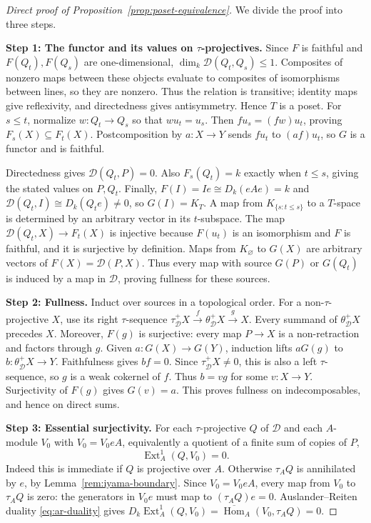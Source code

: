 \documentclass[a4paper,reqno,10pt]{amsart}
\theoremstyle{definition}
\numberwithin{equation}{section}
\DeclareMathOperator{\Hom}{Hom}
\DeclareMathOperator{\Ext}{Ext}
\newcommand{\cD}{\mathcal D}
\newcommand{\Dk}{D_k}
\newcommand{\ohom}{\overline{\Hom}}
\begin{document}
\begin{proof}[Direct proof of Proposition~\ref{prop:poset-equivalence}]
We divide the proof into three steps.

\textbf{Step 1: The functor and its values on \(\tau\)-projectives.}
Since \(F\) is faithful and \(F(Q_t),F(Q_s)\) are one-dimensional,
\(\dim_k\cD(Q_t,Q_s)\leq1\).
Composites of nonzero maps between these objects evaluate to composites of
isomorphisms between lines, so they are nonzero. Thus the relation is
transitive; identity maps give reflexivity, and directedness gives
antisymmetry. Hence \(T\) is a poset.
For \(s\leq t\), normalize \(w:Q_t\to Q_s\) so that \(wu_t=u_s\).
Then \(fu_s=(fw)u_t\), proving \(F_s(X)\subseteq F_t(X)\).
Postcomposition by \(a:X\to Y\) sends \(fu_t\) to \((af)u_t\), so
\(G\) is a functor and is faithful.

Directedness gives \(\cD(Q_t,P)=0\). Also \(F_s(Q_t)=k\) exactly
when \(t\leq s\), giving the stated values on \(P,Q_t\).
Finally, \(F(I)=Ie\cong\Dk(eAe)=k\) and \(\cD(Q_t,I)\cong\Dk(Q_te)\ne0\), so
\(G(I)=K_T\).
A map from \(K_{\{s:t\leq s\}}\) to a \(T\)-space is determined by
an arbitrary vector in its \(t\)-subspace. The map
\(\cD(Q_t,X)\to F_t(X)\) is injective because \(F(u_t)\) is an
isomorphism and \(F\) is faithful, and it is surjective by definition.
Maps from \(K_\varnothing\) to \(G(X)\) are arbitrary vectors of
\(F(X)=\cD(P,X)\). Thus every map with source \(G(P)\) or \(G(Q_t)\)
is induced by a map in \(\cD\), proving fullness for these sources.

\textbf{Step 2: Fullness.}
Induct over sources in a topological order. For a non-\(\tau\)-projective
\(X\), use its right \(\tau\)-sequence
\(\tau_{\cD}^+X\xrightarrow{f}\theta_{\cD}^+X\xrightarrow{g}X\).
Every summand of \(\theta_{\cD}^+X\) precedes \(X\). Moreover, \(F(g)\)
is surjective: every map \(P\to X\) is a non-retraction and factors
through \(g\). Given \(a:G(X)\to G(Y)\), induction lifts \(aG(g)\)
to \(b:\theta_{\cD}^+X\to Y\). Faithfulness gives \(bf=0\).
Since \(\tau_{\cD}^+X\ne0\), this is also a left \(\tau\)-sequence,
so \(g\) is a weak cokernel of \(f\). Thus \(b=vg\) for
some \(v:X\to Y\). Surjectivity of \(F(g)\) gives \(G(v)=a\).
This proves fullness on indecomposables, and hence on direct sums.

\textbf{Step 3: Essential surjectivity.}
For each \(\tau\)-projective \(Q\) of \(\cD\) and each \(A\)-module \(V_0\)
with \(V_0=V_0eA\), equivalently a quotient of a finite sum of copies of \(P\),
\begin{equation}\label{eq:generated-ext}
 \Ext_A^1(Q,V_0)=0.
\end{equation}
Indeed this is immediate if \(Q\) is projective over \(A\). Otherwise
\(\tau_A Q\) is annihilated by \(e\), by Lemma~\ref{rem:iyama-boundary}. Since \(V_0=V_0eA\), every map
from \(V_0\) to \(\tau_A Q\) is zero: the generators in \(V_0e\) must map
to \((\tau_A Q)e=0\). Auslander--Reiten duality \eqref{eq:ar-duality} gives
\(\Dk\Ext_A^1(Q,V_0)=\ohom_A(V_0,\tau_A Q)=0\).


\end{proof}
\end{document}
